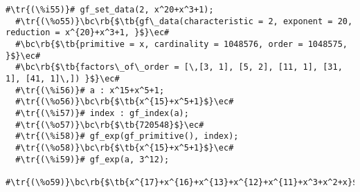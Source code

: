 \documentclass[a4paper,11pt,leqno,fleqn]{artikel3}
\newcommand{\bc}{\begin{center}}
\newcommand{\ec}{\end{center}}
\newcommand{\tr}[1]{\textcolor{red}{#1}}
\newcommand{\tb}[1]{\textcolor{blue}{#1}}
\newcommand{\rb}[1]{\raisebox{2mm}[0mm][1mm]{#1}}
\begin{document}
\vspace*{2mm}
\begin{lstlisting}[escapechar=\#]
  #\tr{(\%i55)}# gf_set_data(2, x^20+x^3+1);
  #\tr{(\%o55)}\bc\rb{$\tb{gf\_data(characteristic = 2, exponent = 20, reduction = x^{20}+x^3+1, }$}\ec#
  #\bc\rb{$\tb{primitive = x, cardinality = 1048576, order = 1048575, }$}\ec#
  #\bc\rb{$\tb{factors\_of\_order = [\,[3, 1], [5, 2], [11, 1], [31, 1], [41, 1]\,]) }$}\ec#
  #\tr{(\%i56)}# a : x^15+x^5+1;
  #\tr{(\%o56)}\bc\rb{$\tb{x^{15}+x^5+1}$}\ec#
  #\tr{(\%i57)}# index : gf_index(a);
  #\tr{(\%o57)}\bc\rb{$\tb{720548}$}\ec#
  #\tr{(\%i58)}# gf_exp(gf_primitive(), index);
  #\tr{(\%o58)}\bc\rb{$\tb{x^{15}+x^5+1}$}\ec#
  #\tr{(\%i59)}# gf_exp(a, 3^12);
  #\tr{(\%o59)}\bc\rb{$\tb{x^{17}+x^{16}+x^{13}+x^{12}+x^{11}+x^3+x^2+x}$}\ec#
\end{lstlisting}
\end{document}
